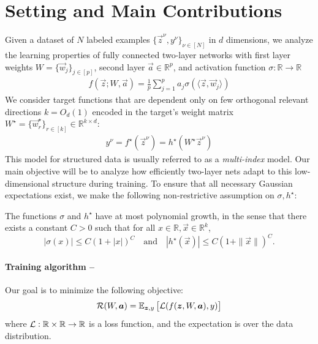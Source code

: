 \section{Setting and Main Contributions}
\label{2405:sec:main:setting}

Given a dataset of $N$ labeled examples $\{\vec z^\nu, y^\nu\}_{\nu \in [N]}$ in $d$ dimensions, we analyze the learning properties of fully connected two-layer networks with first layer weights $W=\{\vec w_j\}_{j \in [p]}$, second layer $\vec a \in \mathbb{R}^p$, and activation function $\sigma: \mathbb R \to \mathbb R$
\begin{align}
    f(\vec z; W, \vec a) = \frac{1}{p} \sum_{j =1}^p a_j \sigma \left(\langle \vec z, \vec w_j \rangle \right) \label{2405:eq:def_nn}
\end{align}
We consider target functions that are dependent only on few orthogonal relevant directions $k=O_d(1)$ encoded in the target's weight matrix $W^\star = \{\vec w^\star_r\}_{r \in [k]} \in \mathbb{R}^{k\times d}$:
\begin{align}
    y^\nu = f^\star(\vec z^\nu) = h^\star(W^\star \vec z^\nu)
\end{align}
This model for structured data is usually referred to as a \textit{multi-index} model. Our main objective will be to analyze how efficiently two-layer nets adapt to this low-dimensional structure during training. To ensure that all necessary Gaussian expectations exist, we make the following non-restrictive assumption on $\sigma, h^\star$:
\begin{assumption}\label{2405:assump:poly_growth}
    The functions $\sigma$ and $h^\star$ have at most polynomial growth, in the sense that there exists a constant $C > 0$ such that for all $x \in \mathbb{R}, \vec{x} \in \mathbb{R}^k$,
    \begin{equation}\label{2405:eq:poly_growth}
        |\sigma(x)| \leq C(1 + |x|)^C \quad \text{and} \quad |h^\star(\vec{x})| \leq C(1 + \|\vec{x}\|)^C.
    \end{equation} 
\end{assumption}
\paragraph{Training algorithm --}
Our goal is to minimize the following objective:
\begin{equation}
    \mathcal{R}(W, {\boldsymbol{a}}) = \mathbb{E}_{{\boldsymbol{z}}, y}\left[ \mathcal{L}(f({\boldsymbol{z}}, W, {\boldsymbol{a}}), y) \right]
\end{equation}
where $\mathcal{L}: \mathbb{R} \times \mathbb{R} \to \mathbb{R}$ is a loss function, and the expectation is over the data distribution.

